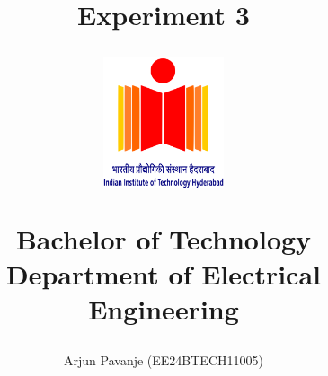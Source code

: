 \documentclass{article}
\begin{document}
\title{\textbf{Experiment 3}\\
\LARGE{\textbf{ }}
\author{ Arjun Pavanje (EE24BTECH11005)}

\begin{center}
\end{center}
\vspace{30pt}
\begin{figure}[ht]
	\centering
	\includegraphics[width = 100pt]{logo.png}\\
\end{figure}
\begin{center}
	Bachelor of Technology\\
	\vspace{10pt}
	Department of Electrical Engineering\\
\end{center}
}
\maketitle
\pagebreak  
\end{document}
